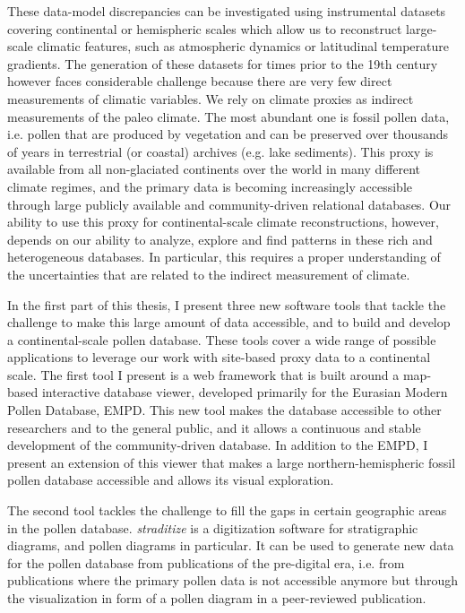 \documentclass[
11pt, %
english, %
singlespacing, %
headsepline, %
]{MastersDoctoralThesis} %
\begin{document}
\begin{NoHyper}
\begin{thesisabstract}[]
These data-model discrepancies can be investigated using instrumental datasets covering continental or hemispheric scales which allow us to reconstruct large-scale climatic features, such as atmospheric dynamics or latitudinal temperature gradients. The generation of these datasets for times prior to the 19th century however faces considerable challenge because there are very few direct measurements of climatic variables. We rely on climate proxies as indirect measurements of the paleo climate. The most abundant one is fossil pollen data, i.e. pollen that are produced by vegetation and can be preserved over thousands of years in terrestrial (or coastal) archives (e.g. lake sediments). This proxy is available from all non-glaciated continents over the world in many different climate regimes, and the primary data is becoming increasingly accessible through large publicly available and community-driven relational databases. Our ability to use this proxy for continental-scale climate reconstructions, however, depends on our ability to analyze, explore and find patterns in these rich and heterogeneous databases. In particular, this requires a proper understanding of the uncertainties that are related to the indirect measurement of climate.

In the first part of this thesis, I present three new software tools that tackle the challenge to make this large amount of data accessible, and to build and develop a continental-scale pollen database. These tools cover a wide range of possible applications to leverage our work with site-based proxy data to a continental scale.
The first tool I present is a web framework that is built around a map-based interactive database viewer, developed primarily for the Eurasian Modern Pollen Database, EMPD. This new tool makes the database accessible to other researchers and to the general public, and it allows a continuous and stable development of the community-driven database. In addition to the EMPD, I present an extension of this viewer that makes a large northern-hemispheric fossil pollen database accessible and allows its visual exploration.

The second tool tackles the challenge to fill the gaps in certain geographic areas in the pollen database. \textit{straditize} is a digitization software for stratigraphic diagrams, and pollen diagrams in particular. It can be used to generate new data for the pollen database from publications of the pre-digital era, i.e. from publications where the primary pollen data is not accessible anymore but through the visualization in form of a pollen diagram in a peer-reviewed publication.


\end{thesisabstract}
\end{NoHyper}
\end{document}
